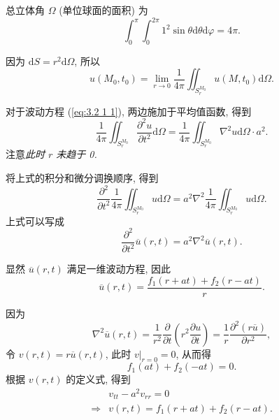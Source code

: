 总立体角 $\Omega$ (单位球面的面积) 为
\begin{equation}
    \int_{0}^{\pi}\int_{0}^{2\pi}1^2\sin\theta\mathrm{d}\theta\mathrm{d}\varphi=4\pi.
\end{equation}

因为 $\mathrm{d}S=r^2\mathrm{d}\Omega$, 所以
\begin{equation}
    u(M_0,t_0)=\lim_{r\rightarrow 0}\frac{1}{4\pi}\iint_{S_r^{M_0}}u(M,t_0)\mathrm{d}\Omega.
\end{equation}

对于波动方程 (\ref{eq:3.2 1 1}), 两边施加于平均值函数, 得到
\begin{equation}
    \frac{1}{4\pi}\iint_{S_r^{M_0}}\frac{\partial^2u}{\partial t^2}\mathrm{d}\Omega=\frac{1}{4\pi}\iint_{S_r^{M_0}}\nabla^2u\mathrm{d}\Omega\cdot a^2.
\end{equation}
注意\textit{此时 $r$ 未趋于 0.}

将上式的积分和微分调换顺序, 得到
\begin{equation}
    \frac{\partial^2}{\partial t^2}\frac{1}{4\pi}\iint_{S_r^{M_0}}u\mathrm{d}\Omega=a^2\nabla^2\frac{1}{4\pi}\iint_{S_r^{M_0}}u\mathrm{d}\Omega.
\end{equation}
上式可以写成
\begin{equation}
    \frac{\partial^2}{\partial t^2}\overline{u}(r,t)=a^2\nabla^2\overline{u}(r,t).
\end{equation}

显然 $\overline{u}(r,t)$ 满足一维波动方程, 因此
\begin{equation}
    \overline{u}(r,t)=\frac{f_1(r+at)+f_2(r-at)}{r}.
\end{equation}

因为
\begin{equation}
    \nabla^2\overline{u}(r,t)=\frac{1}{r^2}\frac{\partial}{\partial t}\left(r^2\frac{\partial u}{\partial t}\right)=\frac{1}{r}\frac{\partial^2(r\overline{u})}{\partial r^2},
\end{equation}
令 $v(r,t)=r\overline{u}(r,t)$, 此时 $v|_{r=0}=0$, 从而得
\begin{equation} \label{eq:3.2 1 star 1}
    f_1(at)+f_2(-at)=0.
\end{equation}
根据 $v(r,t)$ 的定义式, 得到
\begin{equation} \label{eq:3.2 1 star 2}
    \begin{aligned}
                    & v_{tt}-a^2v_{rr}=0          \\
        \Rightarrow & v(r,t)=f_1(r+at)+f_2(r-at).
    \end{aligned}
\end{equation}

